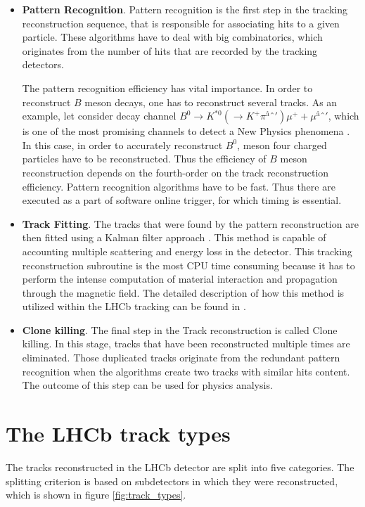 \begin{itemize}
    \item \textbf{Pattern Recognition}. Pattern recognition is the first step in the tracking reconstruction sequence, that is responsible for associating hits to a given particle. These algorithms have to deal with big combinatorics, which originates from the number of hits that are recorded by the tracking detectors. 

    The pattern recognition efficiency has vital importance. In order to reconstruct $B$ meson decays, one has to reconstruct several tracks. As an example, let consider decay channel $B^0 \rightarrow K^{*0} (\rightarrow K^+\pi^â')\mu^+  + \mu^â' $, which is one of the most promising channels to detect a New Physics phenomena \cite{k*mumu}. In this case, in order to accurately reconstruct $B^0$, meson four charged particles have to be reconstructed. Thus the efficiency of $B$ meson reconstruction depends on the fourth-order on the track reconstruction efficiency. 
    Pattern recognition algorithms have to be fast. Thus there are executed as a part of software online trigger, for which timing is essential. 
\item \textbf{Track Fitting}. The tracks that were found by the pattern reconstruction are then fitted using a Kalman filter approach \cite{kalman}\cite{kalman2}. This method is capable of accounting multiple scattering and energy loss in the detector. This tracking reconstruction subroutine is the most CPU time consuming because it has to perform the intense computation of material interaction and propagation through the magnetic field. The detailed description of how this method is utilized within the LHCb tracking can  be found in \cite{lhcb_computing}. 

\item \textbf{Clone killing}. The final step in the Track reconstruction is called Clone killing. In this stage, tracks that have been reconstructed multiple times are eliminated. Those duplicated tracks originate from the redundant pattern recognition when the algorithms create two tracks with similar hits content. The outcome of this step can be used for physics analysis.   
\end{itemize}

\section{The LHCb track types}
The tracks reconstructed in the LHCb detector are split into five categories. The splitting criterion is based on subdetectors in which they were reconstructed, which is shown in figure \ref{fig:track_types}. 

